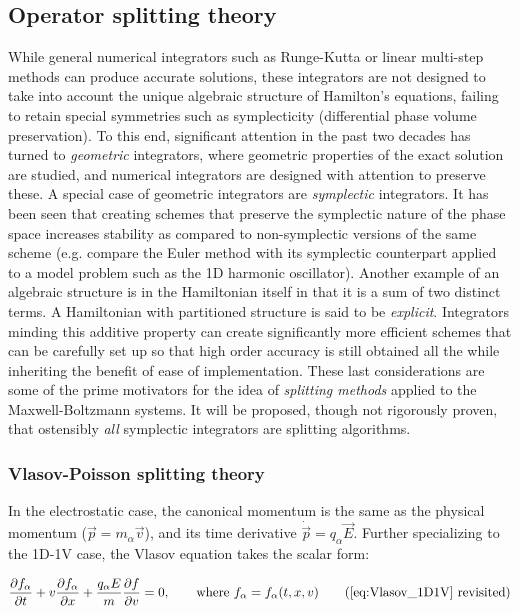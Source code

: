 \documentclass[11pt,titlepage]{report}
\begin{document}
\subsection{Operator splitting theory} \label{subsec:Operator_splitting_theory}

\indent \indent While general numerical integrators such as Runge-Kutta or linear multi-step methods can produce accurate solutions, these integrators are not designed to take into account the unique algebraic structure of Hamilton's equations, failing to retain special symmetries such as symplecticity (differential phase volume preservation). To this end, significant attention in the past two decades has turned to \emph{geometric} integrators, where geometric properties of the exact solution are studied, and numerical integrators are designed with attention to preserve these. A special case of geometric integrators are \emph{symplectic} integrators. It has been seen that creating schemes that preserve the symplectic nature of the phase space increases stability as compared to non-symplectic versions of the same scheme (e.g. compare the Euler method with its symplectic counterpart applied to a model problem such as the 1D harmonic oscillator). Another example of an algebraic structure is in the Hamiltonian itself in that it is a sum of two distinct terms. A Hamiltonian with partitioned structure is said to be \emph{explicit}. Integrators minding this additive property can create significantly more efficient schemes that can be carefully set up so that high order accuracy is still obtained all the while inheriting the benefit of ease of implementation. These last considerations are some of the prime motivators for the idea of \emph{splitting methods} applied to the Maxwell-Boltzmann systems. It will be proposed, though not rigorously proven, that ostensibly \emph{all} symplectic integrators are splitting algorithms.

\subsubsection{Vlasov-Poisson splitting theory}
\indent\indent In the electrostatic case, the canonical momentum is the same as the physical momentum ($\vec{p} = m_{\alpha}\vec{v}$), and its time derivative $\dot{\vec{p}} = q_{\alpha}\vec{E}$. Further specializing to the 1D-1V case, the Vlasov equation takes the scalar form:

\begin{equation*}\frac{\partial f_{\alpha}}{\partial t} + v\frac{\partial f_{\alpha}}{\partial x} + \frac{q_{\alpha}E}{m}\frac{\partial f}{\partial v} = 0, \qquad \textrm{where } f_{\alpha} = f_{\alpha}(t,x,v) \tag{\ref{eq:Vlasov_1D1V} revisited}\end{equation*}
\end{document}
